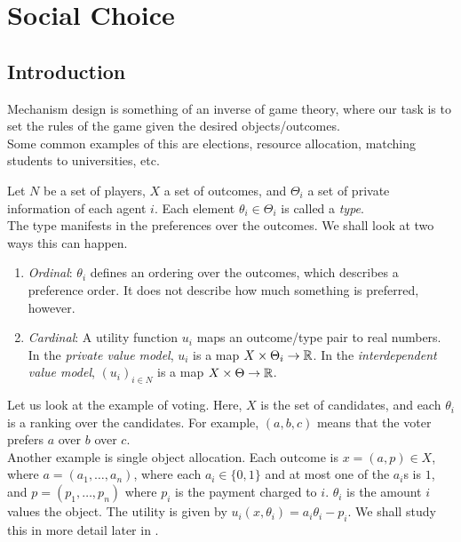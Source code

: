 
\section{Social Choice}

\subsection{Introduction}

	Mechanism design is something of an inverse of game theory, where our task is to set the rules of the game given the desired objects/outcomes.\\
	Some common examples of this are elections, resource allocation, matching students to universities, etc.

	Let $N$ be a set of players, $X$ a set of outcomes, and $\Theta_i$ a set of private information of each agent $i$. Each element $\theta_i \in \Theta_i$ is called a \emph{type}.\\

	The type manifests in the preferences over the outcomes. We shall look at two ways this can happen.
	\begin{enumerate}
	 	\item \emph{Ordinal}: $\theta_i$ defines an ordering over the outcomes, which describes a preference order. It does not describe how much something is preferred, however.
	 	\item \emph{Cardinal}: A utility function $u_i$ maps an outcome/type pair to real numbers. In the \emph{private value model}, $u_i$ is a map $X \times \Theta_i \to \mathbb{R}$. In the \emph{interdependent value model}, $(u_i)_{i \in N}$ is a map $X \times \Theta \to \mathbb{R}$.
	\end{enumerate}

	\begin{fex}
		Let us look at the example of voting. Here, $X$ is the set of candidates, and each $\theta_i$ is a ranking over the candidates. For example, $(a,b,c)$ means that the voter prefers $a$ over $b$ over $c$. \\
		Another example is single object allocation. Each outcome is $x = (a,p) \in X$, where $a = (a_1,\ldots,a_n)$, where each $a_i \in \{0,1\}$ and at most one of the $a_i$s is $1$, and $p = (p_1,\ldots,p_n)$ where $p_i$ is the payment charged to $i$. $\theta_i$ is the amount $i$ values the object. The utility is given by $u_i(x,\theta_i) = a_i\theta_i - p_i$. We shall study this in more detail later in .
	\end{fex}


